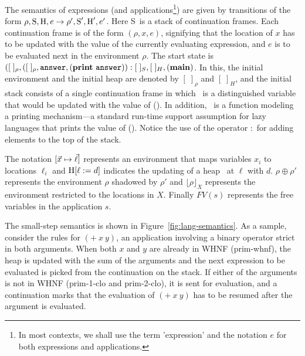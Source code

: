 \documentclass[9pt]{sigplanconf}
\def\myvec{\mathaccent"017E }
\newcommand{\stk}{\mbox{S}}
\begin{document}
The  semantics  of   expressions  (and  applications\footnote{In  most
  contexts, we  shall use  the term 'expression' and the notation $e$  for
both  expressions and
  applications.}) are  given by transitions  of the form  $\rho, \stk,
\heap, e \rightarrow \rho', \stk', \heap', e'$.  Here \stk\ is a stack
of  continuation  frames.  Each  continuation  frame  is  of the  form
$(\rho, x, e)$, signifying that the  location of $x$ has to be updated
with the  value of the currently  evaluating expression, and $e$  is to be
evaluated  next  in  the  environment  $\rho$.   The  start  state  is
$([\;]_\rho,([\;]_\rho,  \mathbf{\mbox{\tt answer}},   (\mathbf{print}~\mathbf{\mbox{\tt answer}})):[\;]_{S}  ,  [\;]_{H},
(\mathbf{main})$.  In  this, the initial  environment and the  initial heap
are  denoted  by  $[\;]_\rho$  and  $[\;]_H$, and  the  initial  stack
consists  of  a  single  continuation   frame  in  which  \ans\  is  a
distinguished  variable  that  would  be  updated with  the  value  of
(\mainpgm).  In  addition, \print\ is a function  modeling a printing
mechanism---a standard  run-time support assumption  for lazy languages
that prints the  value of (\mainpgm).  Notice the  use of the operator
$:$ for adding elements to the top of the stack.




The notation  $[\myvec{x}   \mapsto  \myvec{\ell}]$   represents  an
environment that maps variables $x_i$
to locations $\ell_i$
and  $\mbox{H}[\ell :=  d]$
indicates the  updating of  a heap \heap\  at $\ell$ with  $d$.  $\rho
\oplus \rho'$  represents the  environment $\rho$ shadowed  by $\rho'$
and $\lfloor \rho \rfloor_X$  represents the environment restricted to
the locations in $X$. Finally $FV(s)$ represents the free variables in
the application $s$.

The small-step semantics  is shown in Figure~\ref{fig:lang-semantics}.
As  a sample,  consider  the  rules  for  $(+~x~y)$, an  application
involving a binary operator strict in both arguments.   When
both $x$  and $y$ are already  in WHNF ({\sc prim-whnf}),  the heap is
updated with the  sum of the arguments and  the next expression to be
evaluated is picked from the continuation on the stack. If either of the
arguments is not in
WHNF  ({\sc  prim-1-clo}  and   {\sc  prim-2-clo}),  it  is  sent  for
evaluation, and a continuation  marks that the evaluation of $(+~x~y)$
has to be resumed after the argument is evaluated.
\end{document}
